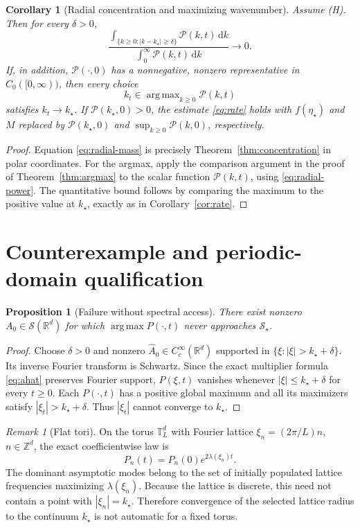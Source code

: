 \documentclass[11pt]{article}
\newtheorem{proposition}[theorem]{Proposition}
\newtheorem{corollary}[theorem]{Corollary}
\theoremstyle{remark}
\newtheorem{remark}[theorem]{Remark}
\newcommand{\R}{\mathbb R}
\newcommand{\Z}{\mathbb Z}
\newcommand{\T}{\mathbb T}
\newcommand{\Sstar}{\mathcal S_\star}
\newcommand{\abs}[1]{\left\lvert#1\right\rvert}
\newcommand{\dd}{\,\mathrm d}
\DeclareMathOperator*{\argmax}{arg\,max}
\begin{document}
\begin{corollary}[Radial concentration and maximizing wavenumber]
\label{cor:radial}
Assume (H). Then for every $\delta>0$,
\begin{equation}\label{eq:radial-mass}
 \frac{\int_{\{k\ge0:\abs{k-k_\star}\ge\delta\}}
 \mathscr P(k,t)\dd k}
 {\int_0^\infty\mathscr P(k,t)\dd k}
 \longrightarrow0.
\end{equation}
If, in addition, $\mathscr P(\cdot,0)$ has a nonnegative,
nonzero representative in $C_0([0,\infty))$, then every choice
\[
 k_t\in\argmax_{k\ge0}\mathscr P(k,t)
\]
satisfies $k_t\to k_\star$.
If $\mathscr P(k_\star,0)>0$, the estimate
\eqref{eq:rate} holds with $f(\eta_\star)$ and $M$ replaced by
$\mathscr P(k_\star,0)$ and
$\sup_{k\ge0}\mathscr P(k,0)$, respectively.
\end{corollary}
\begin{proof}
Equation \eqref{eq:radial-mass} is precisely
Theorem~\ref{thm:concentration} in polar coordinates.
For the argmax, apply the comparison argument in the proof of
Theorem~\ref{thm:argmax} to the scalar function
$\mathscr P(k,t)$, using \eqref{eq:radial-power}.
The quantitative bound follows by comparing the maximum to the
positive value at $k_\star$, exactly as in
Corollary~\ref{cor:rate}.
\end{proof}

\section{Counterexample and periodic-domain qualification}
\begin{proposition}[Failure without spectral access]\label{prop:counter}
There exist nonzero $A_0\in\mathcal S(\R^d)$ for which
$\argmax P(\cdot,t)$ never approaches $\Sstar$.
\end{proposition}
\begin{proof}
Choose $\delta>0$ and nonzero
$\widehat A_0\in C_c^\infty(\R^d)$ supported in
$\{\xi:\abs{\xi}>k_\star+\delta\}$.
Its inverse Fourier transform is Schwartz. Since the exact
multiplier formula \eqref{eq:ahat} preserves Fourier support,
$P(\xi,t)$ vanishes whenever
$\abs{\xi}\le k_\star+\delta$ for every $t\ge0$.
Each $P(\cdot,t)$ has a positive global maximum and all its
maximizers satisfy $\abs{\xi_t}>k_\star+\delta$.
Thus $\abs{\xi_t}$ cannot converge to $k_\star$.
\end{proof}

\begin{remark}[Flat tori]
On the torus $\T_L^d$ with Fourier lattice
$\xi_n=(2\pi/L)n$, $n\in\Z^d$, the exact coefficientwise law is
\[
 P_n(t)=P_n(0)e^{2\lambda(\xi_n)t}.
\]
The dominant asymptotic modes belong to the set of initially
populated lattice frequencies maximizing $\lambda(\xi_n)$.
Because the lattice is discrete, this need not contain a point with
$\abs{\xi_n}=k_\star$. Therefore convergence of the selected
lattice radius to the continuum $k_\star$ is not automatic for a
fixed torus.
\end{remark}
\end{document}
